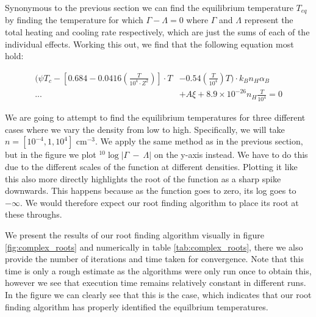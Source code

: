 Synonymous to the previous section we can find the equilibrium temperature $T_{eq}$ by finding the temperature for which $\Gamma - \Lambda = 0$ where $\Gamma$ and $\Lambda$ represent the total heating and cooling rate respectively, which are just the sums of each of the individual effects. Working this out, we find that the following equation most hold:

\begin{align}
    \bigg(\psi T_c - \left[0.684 - 0.0416\left(\frac{T}{10^4\cdot Z^2}\right)\right] \cdot T &- 0.54 \left(\frac{T}{10^4}\right) T \bigg)\cdot k_Bn_H\alpha_B\nonumber \\
    ... &+ A\xi + 8.9 \times 10^{-26}n_H\frac{T}{10^4} = 0\label{eq:equi2}
\end{align}

We are going to attempt to find the equilibrium temperatures for three different cases where we vary the density from low to high. Specifically, we will take $n= [10^{-4}, 1, 10^4]$ cm$^{-3}$. We apply the same method as in the previous section, but in the figure we plot $^{10}\log|\Gamma~-~\Lambda|$ on the y-axis instead. We have to do this due to the different scales of the function at different densities. Plotting it like this also more directly highlights the root of the function as a sharp spike downwards. This happens because as the function goes to zero, its log goes to $-\infty$. We would therefore expect our root finding algorithm to place its root at these throughs.

We present the results of our root finding algorithm visually in figure \ref{fig:complex_roots} and numerically in table \ref{tab:complex_roots}, there we also provide the number of iterations and time taken for convergence. Note that this time is only a rough estimate as the algorithms were only run once to obtain this, however we see that execution time remains relatively constant in different runs. In the figure we can clearly see that this is the case, which indicates that our root finding algorithm has properly identified the equilbrium temperatures.

